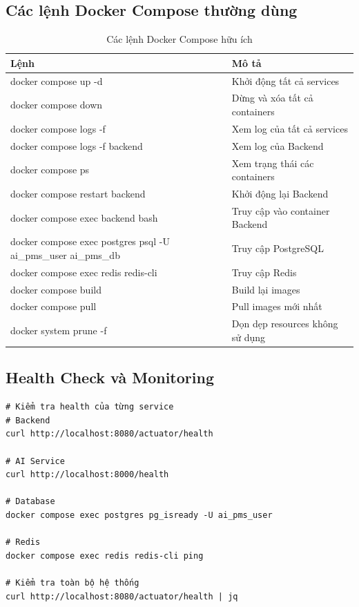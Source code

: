 \documentclass[12pt,a4paper]{report}
\begin{document}
\subsection{Các lệnh Docker Compose thường dùng}

\begin{table}[H]
\centering
\caption{Các lệnh Docker Compose hữu ích}
\begin{tabular}{|p{5cm}|p{9cm}|}
\hline
\textbf{Lệnh} & \textbf{Mô tả} \\
\hline
docker compose up -d & Khởi động tất cả services \\
\hline
docker compose down & Dừng và xóa tất cả containers \\
\hline
docker compose logs -f & Xem log của tất cả services \\
\hline
docker compose logs -f backend & Xem log của Backend \\
\hline
docker compose ps & Xem trạng thái các containers \\
\hline
docker compose restart backend & Khởi động lại Backend \\
\hline
docker compose exec backend bash & Truy cập vào container Backend \\
\hline
docker compose exec postgres psql -U ai_pms_user ai_pms_db & Truy cập PostgreSQL \\
\hline
docker compose exec redis redis-cli & Truy cập Redis \\
\hline
docker compose build & Build lại images \\
\hline
docker compose pull & Pull images mới nhất \\
\hline
docker system prune -f & Dọn dẹp resources không sử dụng \\
\hline
\end{tabular}
\label{tab:docker_commands}
\end{table}

\subsection{Health Check và Monitoring}

\begin{verbatim}
# Kiểm tra health của từng service
# Backend
curl http://localhost:8080/actuator/health

# AI Service
curl http://localhost:8000/health

# Database
docker compose exec postgres pg_isready -U ai_pms_user

# Redis
docker compose exec redis redis-cli ping

# Kiểm tra toàn bộ hệ thống
curl http://localhost:8080/actuator/health | jq
\end{verbatim}
\end{document}
